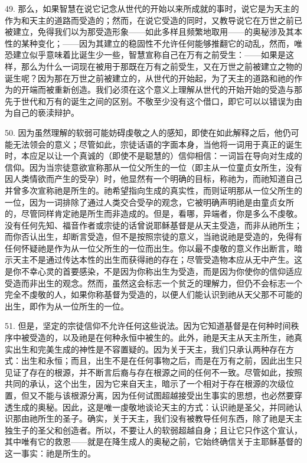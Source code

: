 49. 那么，如果智慧在说它记念从世代的开始以来所成就的事时，说它是为天主的作为和天主的道路而受造的；然而，在说它受造的同时，又教导说它在万世之前已被建立，免得我们以为那受造形象——如此多样且频繁地取用——的奥秘涉及其本性的某种变化；——因为其建立的稳固性不允许任何能够推翻它的动乱，然而，唯恐建立似乎意味着比诞生少一些，智慧宣称自己在万有之前受生：——如果是这样，那么为什么一词现在被用于那既在万有之前受生，又在万世之前被建立之物的诞生呢？因为那在万世之前被建立的，从世代的开始起，为了天主的道路和祂的作为的开端而被重新创造。我们必须在这个意义上理解从世代的开始开始的受造与那先于世代和万有的诞生之间的区别。不敬至少没有这个借口，即它可以以错误为由为自己的亵渎辩护。\par

50. 因为虽然理解的软弱可能妨碍虔敬之人的感知，即使在如此解释之后，他仍可能无法领会的意义；尽管如此，宗徒话语的字面本身，当他将一词用于真正的诞生时，本应足以让一个真诚的（即使不是聪慧的）信仰相信：一词旨在导向对生成的信仰。因为当宗徒意欲宣称那从一位父所生的一位（即主从一位童贞女所生，没有因人类情欲而产生的受孕）时，他显然有一个明确的目标，称祂为，而祂知道自己并曾多次宣称祂是所生的。祂希望指向生成的真实性，而则证明那从一位父所生的一位，因为一词排除了通过人类交合受孕的观念，它被明确声明祂是由童贞女所的，尽管同样肯定祂是所生而非造成的。但是，看哪，异端者，你是多么不虔敬。没有任何先知、福音作者或宗徒的话曾说耶稣基督是从天主受造，而非从祂所生；而你否认出生，却断言受造，但不是按照宗徒的意义，当祂说祂是受造的，免得有任何怀疑祂是作为从一位父所生的一位而出生。你以最不虔敬的意义作出断言，暗示天主不是通过传达本性的出生而获得祂的存在；尽管受造物本应从无中产生。这是你不幸心灵的首要感染，不是因为你称出生为受造，而是因为你使你的信仰适应受造而非出生的观念。然而，虽然这会标志一个贫乏的理解力，但仍不会标志一个完全不虔敬的人，如果你称基督为受造的，以便人们能认识到祂从天父那不可能的出生，即作为从一位所生的一位。\par

51. 但是，坚定的宗徒信仰不允许任何这些说法。因为它知道基督是在何种时间秩序中被受造的，以及祂是在何种永恒中被生的。此外，祂是天主从天主所生，祂真实出生和完美生成的神性是不容置疑的。因为关于天主，我们只承认两种存在方式：出生和永恒；而且，出生不是在任何事物之后，而是在万有之前，因此出生只见证了存在的根源，并不断言后裔与存在根源之间的任何不一致。尽管如此，按照共同的承认，这个出生，因为它来自天主，暗示了一个相对于存在根源的次级位置，但又不能与该根源分离，因为任何试图超越接受出生事实的思想，也必然要穿透生成的奥秘。因此，这是唯一虔敬地谈论天主的方式：认识祂是圣父，并同祂认识那由祂所生的圣子。确实，关于天主，我们没有被教导任何东西，除了祂是天主独生子的圣父和创造者。所以，不要让人的软弱超越自身；且让它只作这个宣认，其中唯有它的救恩——就是在降生成人的奥秘之前，它始终确信关于主耶稣基督的这一事实：祂是所生的。\par


